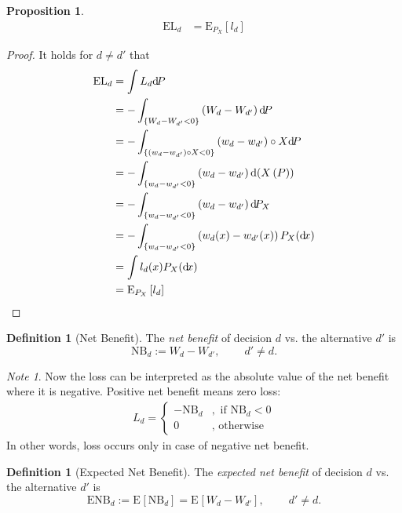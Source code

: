 \documentclass[a4paper,10pt,twoside,pagesize,abstracton]{scrartcl}
\renewcommand{\d}{\mathrm{d}\!} %
\newcommand{\E}[2][]{\mathrm{E}_{#1}\left[#2\right]} %
\newcommand{\EL}{\mathrm{EL}} %
\newcommand{\NB}{\mathrm{NB}} %
\newcommand{\ENB}{\mathrm{ENB}} %
\theoremstyle{plain}%
\newtheorem{prop}[thm]{Proposition}
\theoremstyle{definition}
\newtheorem{defn}[thm]{Definition}
\theoremstyle{remark}
\newtheorem*{note}{Note}
\begin{document}
\begin{prop} 
  \begin{align} 
   \EL_d &= \E[P_X]{l_d}	  
  \end{align}
\end{prop}
\begin{proof}
    It holds for $d\neq d'$ that
   \begin{align} 
   \EL_d &= 	\int L_d \d P\nonumber\\
	  &= - 	\int_{\{W_d - W_{d'} < 0\}} \left( W_d - W_{d'}\right) \d P\nonumber\\
	  &= - 	\int_{\left\{\left(w_d - w_{d'}\right) \circ X < 0\right\}} \left(w_d - w_{d'}\right) \circ X \d P\nonumber\\
	  &= - 	\int_{\left\{w_d - w_{d'} < 0\right\}} \left(w_d - w_{d'}\right) \d\left(X\left(P\right)\right)\nonumber\\
	  &= - 	\int_{\left\{w_d - w_{d'} < 0\right\}} \left(w_d - w_{d'}\right) \d P_X\nonumber\\
	  &= - 	\int_{\left\{w_d - w_{d'} < 0\right\}} \left(w_d(x) - w_{d'}(x)\right)  P_X(\d x)\nonumber\\	
	  &= 	\int l_d(x)  P_X(\d x)\nonumber\\
	  &= 	\E[P_X]{l_d}\nonumber \qedhere 
  \end{align}
\end{proof}
\begin{defn}[Net Benefit]
  \label{defn:netBenefit}
 The \emph{net benefit} of decision $d$ vs. the alternative $d'$ is
  \begin{equation}
  \NB_d := W_d - W_{d'}, \qquad ~ d'\neq d.
 \end{equation}
\end{defn}
\begin{note} Now the loss can be interpreted as the absolute value of the net benefit where it is negative. Positive net benefit means zero loss:
 \begin{align}
  L_d = 
    \begin{cases} 
     - \NB_d &, \textrm{~if~} \NB_d  < 0\\
     0 &, \textrm{~otherwise}
    \end{cases}
 \end{align}
 In other words, loss occurs only in case of negative net benefit.
\end{note}
\begin{defn}[Expected Net Benefit]
 The \emph{expected net benefit} of decision $d$ vs. the alternative $d'$ is
 \begin{equation}
  \ENB_d := \E{\NB_d} = \E{W_d - W_{d'}}, \qquad ~ d'\neq d.
 \end{equation}
\end{defn}
\end{document}
